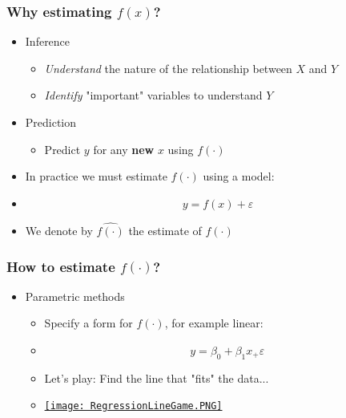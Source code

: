 \documentclass[xcolor=x11names,compress, aspectratio=169]{beamer}
\renewcommand{\(}{\begin{columns}}
\renewcommand{\)}{\end{columns}}
\newcommand{\<}[1]{\begin{column}{#1}}
\renewcommand{\>}{\end{column}}
\begin{document}


\begin{frame} %
\frametitle{Why estimating $f(x)$?}

\pause

 \begin{itemize}
  \item<+-> Inference
   \begin{itemize}
  \item<+->[] \textit{Understand} the nature of the relationship between $X$ and $Y$
  \item<+->[] \textit{Identify}  "important" variables to understand $Y$
 \end{itemize}
  \item<+-> Prediction
   \begin{itemize}
  \item<+->[] Predict $y$ for any \textbf{new} $x$ using $f(\cdot)$
 \end{itemize}
 \item<+-> In practice we must estimate  $f(\cdot)$ using a model:
 \item<+->[] $$ y = f(x) + \varepsilon $$
 \item<+->[] We denote by $\widehat{f(\cdot)}$ the estimate of $f(\cdot)$
 \end{itemize}
\end{frame}


\begin{frame} %
\frametitle{How to estimate $f(\cdot)$?}
 \begin{itemize}
  \item<+-> Parametric methods
   \begin{itemize}[<+->]
      \item[] Specify a form for $f(\cdot)$, for example linear:
      \item[] $$y = \beta_0 + \beta_1 x_ + \varepsilon$$
      \item Let's play: Find the line that "fits" the data...
      \item[]  \href{https://xtophedataviz.shinyapps.io/RegressionApp/}{\texttt{[image: RegressionLineGame.PNG]}}
 \end{itemize}
 \end{itemize}
\end{frame}
\end{document}
